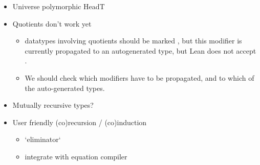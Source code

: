 \begin{todo}
    


    \begin{itemize}
        \item Universe polymorphic HeadT
        
        \item Quotients don't work yet
              \begin{itemize}
                \item datatypes involving quotients should be marked , but this modifier is currently propagated to an autogenerated \inductive{} type, but Lean does not accept .

                \item We should check which modifiers have to be propagated, and to which of the auto-generated types.
              \end{itemize}
        

        \item Mutually recursive types?
        
        \item User friendly (co)recursion / (co)induction
                \begin{itemize}
                    \item `eliminator`
                    \item integrate with equation compiler
                \end{itemize}
    \end{itemize}
\end{todo}



